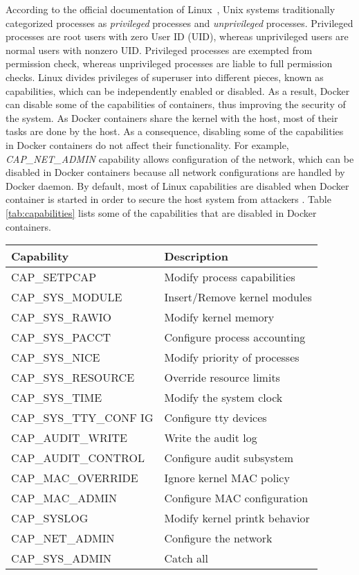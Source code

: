 According to the official documentation of Linux~\cite{man7},
Unix systems traditionally categorized processes as \textit{privileged} processes and
\textit{unprivileged} processes. Privileged processes are root users with
zero User ID (UID), whereas unprivileged users are normal users with nonzero
UID. Privileged processes are exempted from permission check, whereas
unprivileged processes are liable to full permission checks.
Linux divides privileges of superuser into different pieces, known as
capabilities, which can be independently enabled or disabled.
As a result, Docker can disable some of the capabilities of containers,
thus improving the security of the system. As Docker containers share the
kernel with the host, most of their tasks are done by the host. As a
consequence, disabling some of the capabilities in Docker containers do
not affect their functionality. For example, \textit{CAP\_NET\_ADMIN}
capability allows configuration of the network, which can be disabled in
Docker containers because all network configurations are handled by
Docker daemon. By default, most of Linux capabilities are disabled
when Docker container is started in order to secure the host system
from attackers \cite{walsh2}. Table \ref{tab:capabilities} lists some of the
capabilities that are disabled in Docker containers.
\newline
\begin{center}
\tabulinesep=1.2mm
\begin{tabu} to \textwidth { | X[l] | X[l] | }
\hline
	\textbf{Capability} & \textbf{Description} \\
\hline
 CAP\_SETPCAP & Modify process capabilities \\
 \hline
CAP\_SYS\_MODULE & Insert/Remove kernel modules \\
 \hline
CAP\_SYS\_RAWIO & Modify kernel memory \\
 \hline
CAP\_SYS\_PACCT & Configure process accounting \\
 \hline
CAP\_SYS\_NICE &  Modify priority of processes \\
 \hline
CAP\_SYS\_RESOURCE & Override resource limits \\
 \hline
CAP\_SYS\_TIME & Modify the system clock \\
 \hline
CAP\_SYS\_TTY\_CONF IG & Configure tty devices \\
 \hline
CAP\_AUDIT\_WRITE & Write the audit log \\
 \hline
CAP\_AUDIT\_CONTROL & Configure audit subsystem \\
 \hline
CAP\_MAC\_OVERRIDE & Ignore kernel MAC policy \\
 \hline
CAP\_MAC\_ADMIN & Configure MAC configuration \\
 \hline
CAP\_SYSLOG & Modify kernel printk behavior \\
 \hline
CAP\_NET\_ADMIN & Configure the network \\
 \hline
CAP\_SYS\_ADMIN & Catch all \\
 \hline
\end{tabu}
\label{tab:capabilities}
\end{center}

